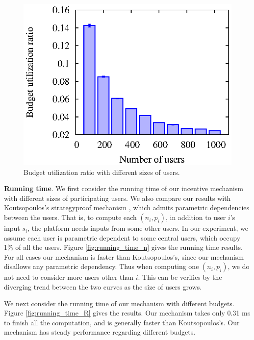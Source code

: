 \documentclass[conference]{IEEEtran}
\theoremstyle{definition}
\begin{document}
{\begin{figure}[!t]
\begin{minipage}{0.31\textwidth}
\end{minipage}
\hspace{0.01cm}
\begin{minipage}{0.31\textwidth}
\includegraphics[width=\textwidth]{collusion_resist_codes/images/img_rho.eps}
\caption{Budget utilization ratio with different sizes of users.}
\label{fig:rho_n}
\end{minipage}
\end{figure}

{\bf Running time}. We first consider the running time of our incentive mechanism with different sizes of participating users. We also compare our results with Koutsopoulos's strategyproof mechanism \cite{koutsopoulos2013optimal}, which admits parametric dependencies between the users. That is, to compute each $(n_i,p_i)$, in addition to user $i$'s input $s_i$, the platform needs inputs from some other users. In our experiment, we assume each user is parametric dependent to some central users, which occupy 1\% of all the users. Figure \ref{fig:running_time_n} gives the running time results. For all cases our mechanism is faster than Koutsopoulos's, since our mechanism disallows any parametric dependency. Thus when computing one $(n_i,p_i)$, we do not need to consider more users other than $i$. This can be verifies by the diverging trend between the two curves as the size of users grows.

We next consider the running time of our mechanism with different budgets. Figure \ref{fig:running_time_R} gives the results. Our mechanism takes only 0.31 ms to finish all the computation, and is generally faster than Koutsopoulos's. Our mechanism has steady performance regarding different budgets.

}
\end{document}
